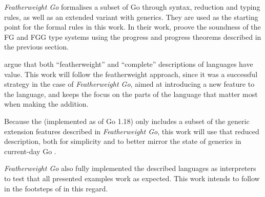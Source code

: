 \emph{Featherweight Go} formalises a subset of Go through syntax, reduction and
typing rules, as well as an extended variant with generics. They are used as the
starting point for the formal rules in this work. In their work, \citeauthor{fg}
proove the soundness of the FG and FGG type systems using the progress and
progress theorems described in the previous section.

\citeauthor{fg} argue that both ``featherweight'' and ``complete'' descriptions
of languages have value. This work will follow the featherweight approach, since
it was a successful strategy in the case of \emph{Featherweight Go}, aimed at
introducing a new feature to the language, and keeps the focus on the parts of
the language that matter most when making the addition.

Because the  (implemented as of Go 1.18) only
includes a subset of the generic extension features described in
\emph{Featherweight Go}, this work will use that reduced description, both for
simplicity and to better mirror the state of generics in current-day Go
\autocite{genericsProposal}.

\emph{Featherweight Go} also fully implemented the described languages as
interpreters to test that all presented examples work as expected. This work
intends to follow in the footsteps of \citeauthor{fg} in this regard.
